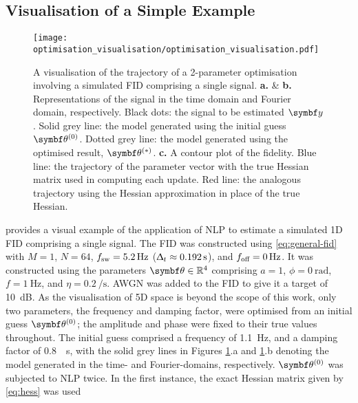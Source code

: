 \subsection{Visualisation of a Simple Example}
\label{subsec:optim-vis}
\begin{figure}
    \centering
    \texttt{[image: optimisation\_visualisation/optimisation\_visualisation.pdf]}
    \caption[
        A visualisation of the trajectory of a 2-parameter optimisation
        involving a simulated \acs{FID}.
    ]
    {
        A visualisation of the trajectory of a 2-parameter optimisation
        involving a simulated \acs{FID} comprising a single signal.
        \textbf{a.} \& \textbf{b.} Representations of the signal in
        the time domain and Fourier domain, respectively.
        Black dots: the signal to be estimated $\by$.
        Solid grey line: the model generated
        using the initial guess $\bthzero$.
        Dotted grey line: the model generated using the optimised result,
        $\bthstar$.
        \textbf{c.} A contour plot of the fidelity.
        Blue line: the trajectory of the parameter vector with the true
        Hessian matrix used in computing each update.
        Red line: the analogous trajectory using the Hessian approximation
        in place of the true Hessian.
    }
    \label{fig:optim-vis}
\end{figure}
 provides a visual example of the application of \ac{NLP}
to estimate a simulated \ac{1D} \ac{FID} comprising a single signal.
The FID was constructed using \cref{eq:general-fid} with $M=1$,
$N = 64$, $f_{\mathrm{sw}} = \qty{5.2}{\hertz}$ ($\Updelta_t \approx
\qty{0.192}{\second}$), and $f_{\text{off}} = \qty{0}{\hertz}$.
It was constructed using the parameters $\bth \in \mathbb{R}^4$ comprising $a=1$,
$\phi=\qty{0}{\radian}$, $f=\qty{1}{\hertz}$, and $\eta=\qty{0.2}{\per\second}$.
\ac{AWGN} was added to the \ac{FID} to give it a target  of
\qty{10}{\deci\bel}. As the visualisation of 5D space is beyond the scope of
this work, only two parameters, the frequency and damping factor, were optimised
from an initial guess $\bthzero$; the amplitude and phase were fixed to
their true values throughout. The initial guess comprised a frequency of
\qty{1.1}{\hertz}, and a damping factor of \qty{0.8}{\per\second}, with the
solid grey lines in Figures \ref{fig:optim-vis}.a and \ref{fig:optim-vis}.b
denoting the model generated in the time- and
Fourier-domains, respectively. $\bthzero$ was subjected to \ac{NLP} twice. In
the first instance, the exact Hessian matrix given by \cref{eq:hess} was used
